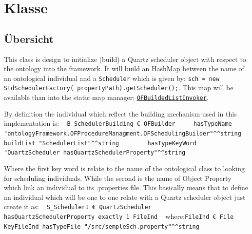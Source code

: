 
\section[OFSchedulingBuilder]{Klasse }\label{ontologyFramework.OFProcedureManagment.OFSchedulingBuilder-class}
\subsection{Übersicht}
This class is design to initialize (build) a Quartz scheduler
 object with respect to the ontology into the framework. It
 will build an HashMap between the name of an ontological individual 
 and a \texttt{Scheduler} which is given by:
 \verb!sch = new StdSchedulerFactory( propertyPath).getScheduler();!.
 This map will be available than into the static map manager: 
 \texttt{\hyperlink{ontologyFramework.OFRunning.OFInvokingManager.OFBuildedListInvoker-class}{OFBuildedListInvoker}}.
 
 By definition the individual which reflect the building mechanism 
 used in this implementation is:
 {\ttfamily
\mbox{ }	\verb!B_SchedulerBuilding € OFBuilder !\mbox{ }\mbox{ }\mbox{}\newline
\mbox{ }		\verb!hasTypeName "ontologyFramework.OFProcedureManagment.OFSchedulingBuilder"^^string!\mbox{}\newline
\mbox{ }		\verb!buildList "SchedulerList"^^string!\mbox{ }\mbox{ }\mbox{ }\mbox{ }\mbox{ }\mbox{ }\mbox{}\newline
\mbox{ }		\verb!hasTypeKeyWord "QuartzScheduler hasQuartzSchedulerProperty"^^string!\mbox{ }\mbox{}\newline
\mbox{ }}

 Where the first key word is relate to the name of the ontological
 class to looking for scheduling individuals. While the second is
 the name of Object Property which link an individual to its
 .properties file.  
 This basically means that to define an individual which will be 
 one to one relate with a Quartz scheduler object just create it as:
 {\ttfamily
\mbox{ }	\verb!S_Scheduler1 € QuartzScheduler !\mbox{ }\mbox{ }\mbox{ }\mbox{ }\mbox{ }\mbox{ }\mbox{ }\mbox{ }\mbox{}\newline
\mbox{ }		\verb!hasQuartzSchedulerProperty exactly 1 FileInd!\mbox{}\newline
\mbox{ }			where:\verb!FileInd € File!\mbox{}\newline
\mbox{ }					\verb!KeyFileInd hasTypeFile "/src/sempleSch.property"^^string!\mbox{ }\mbox{}\newline
\mbox{ }}


